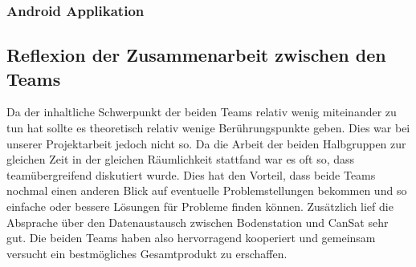 \subsubsection{Android Applikation}


\subsection{Reflexion der Zusammenarbeit zwischen den Teams}
Da der inhaltliche Schwerpunkt der beiden Teams relativ wenig miteinander zu tun hat sollte es theoretisch relativ wenige Berührungspunkte geben. Dies war bei unserer Projektarbeit jedoch nicht so. Da die Arbeit der beiden Halbgruppen zur gleichen Zeit in der gleichen Räumlichkeit stattfand war es oft so, dass teamübergreifend  diskutiert wurde. Dies hat den Vorteil, dass beide Teams nochmal einen anderen Blick auf eventuelle Problemstellungen bekommen und so einfache oder bessere Lösungen für Probleme finden können. Zusätzlich lief die Absprache über den Datenaustausch zwischen Bodenstation und CanSat sehr gut. Die beiden Teams haben also hervorragend kooperiert und gemeinsam versucht ein bestmögliches Gesamtprodukt zu erschaffen.
